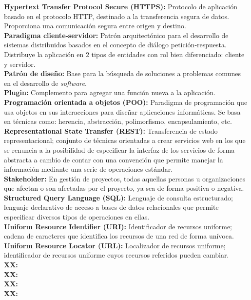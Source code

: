 \documentclass[12pt,a4paper, twoside]{report}
\begin{document}
	\textbf{Hypertext Transfer Protocol Secure (HTTPS):} Protocolo de aplicación basado en el protocolo HTTP, destinado a la transferencia segura de datos. Proporciona una comunicación segura entre origen y destino. \\
	\textbf{Paradigma cliente-servidor:} Patrón arquitectónico para el desarrollo de sistemas distribuidos basados en el concepto de diálogo petición-respuesta. Distribuye la aplicación en 2 tipos de entidades con rol bien diferenciado: cliente y servidor. \\
	\textbf{Patrón de diseño:} Base para la búsqueda de soluciones a problemas comunes en el desarrollo de \textit{software}. \\
	\textbf{Plugin:} Complemento para agregar una función nueva a la aplicación. \\
	\textbf{Programación orientada a objetos (POO):} Paradigma de programación que usa objetos en sus interacciones para diseñar aplicaciones informáticas. Se basa en técnicas como: herencia, abstracción, polimorfismo, encapsulamiento, etc. \\
	\textbf{Representational State Transfer (REST):} Transferencia de estado representacional; conjunto de técnicas orientadas a crear servicios web en los que se renuncia a la posibilidad de especificar la interfaz de los servicios de forma abstracta a cambio de contar con una convención que permite manejar la información mediante una serie de operaciones estándar. \\
	\textbf{Stakeholder:} En gestión de proyectos, todas aquellas personas u organizaciones que afectan o son afectadas por el proyecto, ya sea de forma positiva o negativa. \\
	\textbf{Structured Query Language (SQL):} Lenguaje de consulta estructurado; lenguaje declarativo de acceso a bases de datos relacionales que permite especificar diversos tipos de operaciones en ellas. \\
	\textbf{Uniform Resource Identifier (URI):} Identificador de recursos uniforme; cadena de caracteres que identifica los recursos de una red de forma unívoca. \\
	\textbf{Uniform Resource Locator (URL):} Localizador de recursos uniforme; identificador de recursos uniforme cuyos recursos referidos pueden cambiar. \\
	\textbf{XX:} \\
	\textbf{XX:} \\
	\textbf{XX:} \\
	\textbf{XX:} \\
\end{document}
